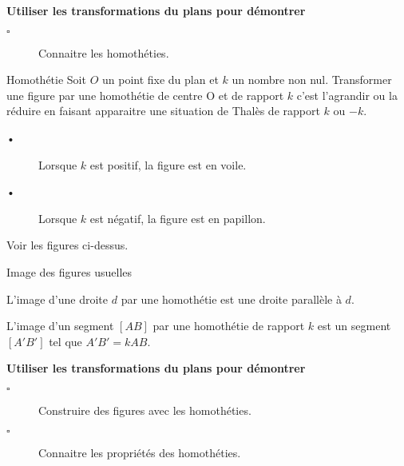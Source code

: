 \documentclass[openany]{book}
\begin{document}
\begin{seance}

\end{seance}


\begin{CpsCol}
\textbf{Utiliser les transformations du plans pour démontrer}
\begin{description}
\item[$\square$] Connaitre les homothéties.
\end{description}
\end{CpsCol}



\begin{DefT}{Homothétie}
Soit $O$ un point fixe du plan et $k$ un nombre non nul.
Transformer une figure par une homothétie de centre O et de rapport $k$ c'est l'agrandir ou la réduire en faisant apparaitre une situation de Thalès de rapport $k$ ou $-k$.
\begin{description}
\item[•] Lorsque $k$ est positif, la figure est en voile.
\item[•] Lorsque $k$ est négatif, la figure est en papillon. 
\end{description}

{\footnotesize Voir les figures ci-dessus.}
\end{DefT}





\begin{ThT}{Image des figures usuelles}
\begin{description}
\item L'image d'une droite $d$ par une homothétie est une droite parallèle à $d$.
\item L'image d'un segment $[AB]$ par une homothétie de rapport $k$ est un segment $[A'B']$ tel que $A'B'=kAB$. 
\end{description}
\end{ThT}


\begin{seance}

\end{seance}

\begin{CpsCol}
\textbf{Utiliser les transformations du plans pour démontrer}
\begin{description}
\item[$\square$] Construire des figures avec les homothéties.
\item[$\square$] Connaitre les propriétés des homothéties.
\end{description}
\end{CpsCol}
\end{document}
